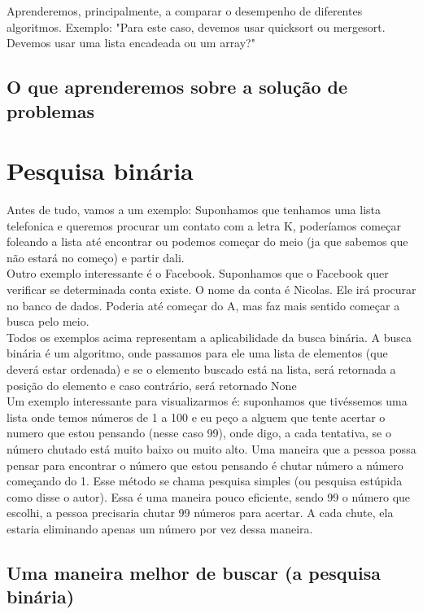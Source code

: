 \documentclass{report}
\begin{document}
	Aprenderemos, principalmente, a comparar o desempenho de diferentes algoritmos. Exemplo: "Para este caso, devemos usar quicksort ou mergesort. Devemos usar uma lista encadeada ou um array?"
	
	\subsection{O que aprenderemos sobre a solução de problemas}
	
	\section{Pesquisa binária}
	
	Antes de tudo, vamos a um exemplo: Suponhamos que tenhamos uma lista telefonica e queremos procurar um contato com a letra K, poderíamos começar foleando a lista até encontrar ou podemos começar do meio (ja que sabemos que não estará no começo) e partir dali.\\
	
	
	Outro exemplo interessante é o Facebook. Suponhamos que o Facebook quer verificar se determinada conta existe. O nome da conta é Nicolas. Ele irá procurar no banco de dados. Poderia até começar do A, mas faz mais sentido começar a busca pelo meio. \\
	
	Todos os exemplos acima representam a aplicabilidade da busca binária. A busca binária é um algoritmo, onde passamos para ele uma lista de elementos (que deverá estar ordenada) e se o elemento buscado está na lista, será retornada a posição do elemento e caso contrário, será retornado None \\
	
	Um exemplo interessante para visualizarmos é: suponhamos que tivéssemos uma lista onde temos números de 1 a 100 e eu peço a alguem que tente acertar o numero que estou pensando (nesse caso 99), onde digo, a cada tentativa, se o número chutado está muito baixo ou muito alto. Uma maneira que a pessoa possa pensar para encontrar o número que estou pensando é chutar número a número começando do 1. Esse método se chama pesquisa simples (ou pesquisa estúpida como disse o autor). Essa é uma maneira pouco eficiente, sendo 99 o número que escolhi, a pessoa precisaria chutar 99 números para acertar. A cada chute, ela estaria eliminando apenas um número por vez dessa maneira.
	
	
	\subsection{Uma maneira melhor de buscar (a pesquisa binária)}
	
\end{document}
